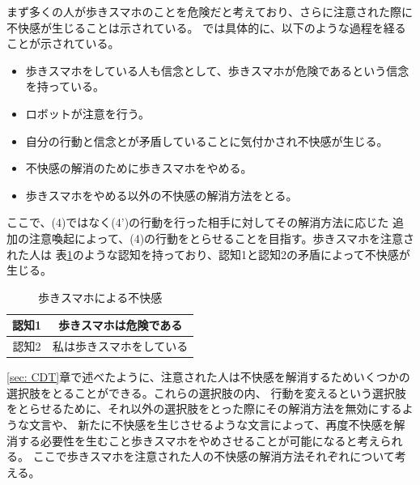 \documentclass{kuisthesis}
\begin{document}
まず多くの人が歩きスマホのことを危険だと考えており、さらに注意された際に不快感が生じることは示されている。
\cite{Schneider2022}では具体的に、以下のような過程を経ることが示されている。
\begin{itemize}
  \item[(1)] 歩きスマホをしている人も信念として、歩きスマホが危険であるという信念を持っている。
  \item[(2)] ロボットが注意を行う。
  \item[(3)] 自分の行動と信念とが矛盾していることに気付かされ不快感が生じる。
  \item[(4)] 不快感の解消のために歩きスマホをやめる。
  \item[(4')]歩きスマホをやめる以外の不快感の解消方法をとる。
  \label{item: dissonance}
\end{itemize}
ここで、(4)ではなく(4')の行動を行った相手に対してその解消方法に応じた
追加の注意喚起によって、(4)の行動をとらせることを目指す。歩きスマホを注意された人は
表\ref{fig: UsingPhone}のような認知を持っており、認知1と認知2の矛盾によって不快感が生じる。
\begin{table}[h]
  \centering
  \caption{歩きスマホによる不快感}
  \label{fig: UsingPhone}
  \begin{tabular}{c|c}

      認知1 & 歩きスマホは危険である  \\ \hline
      認知2 & 私は歩きスマホをしている \\ 
  \end{tabular}
\end{table}
\ref{sec: CDT}章で述べたように、注意された人は不快感を解消するためいくつかの選択肢をとることができる。これらの選択肢の内、
行動を変えるという選択肢をとらせるために、それ以外の選択肢をとった際にその解消方法を無効にするような文言や、
新たに不快感を生じさせるような文言によって、再度不快感を解消する必要性を生むこと歩きスマホをやめさせることが可能になると考えられる。
ここで歩きスマホを注意された人の不快感の解消方法それぞれについて考える。
\end{document}
